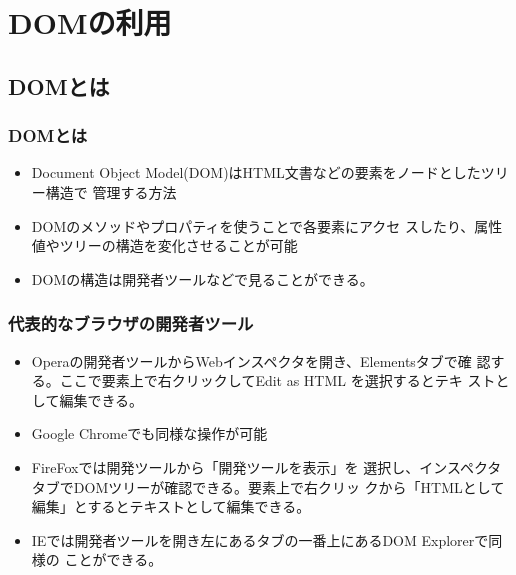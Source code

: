 \documentclass[dvipsk]{beamer}
\begin{document}
\section{DOMの利用}
\subsection{DOMとは}
\begin{frame}[containsverbatim]
 \frametitle{DOMとは}
\begin{itemize}
 \item Document Object Model(DOM)はHTML文書などの要素をノードとしたツリー構造で
管理する方法
 \item DOMのメソッドやプロパティを使うことで各要素にアクセ
スしたり、属性値やツリーの構造を変化させることが可能
 \item DOMの構造は開発者ツールなどで見ることができる。
\end{itemize}
\end{frame}
\begin{frame}[containsverbatim]
 \frametitle{代表的なブラウザの開発者ツール}
\begin{itemize}
 \item Operaの開発者ツールからWebインスペクタを開き、Elementsタブで確
       認する。ここで要素上で右クリックしてEdit as HTML を選択するとテキ
       ストとして編集できる。
 \item Google Chromeでも同様な操作が可能
 \item FireFoxでは開発ツールから「開発ツールを表示」を
       選択し、インスペクタタブでDOMツリーが確認できる。要素上で右クリッ
       クから「HTMLとして編集」とするとテキストとして編集できる。
 \item IEでは開発者ツールを開き左にあるタブの一番上にあるDOM Explorerで同様の
       ことができる。
\end{itemize}
\end{frame}
\end{document}
